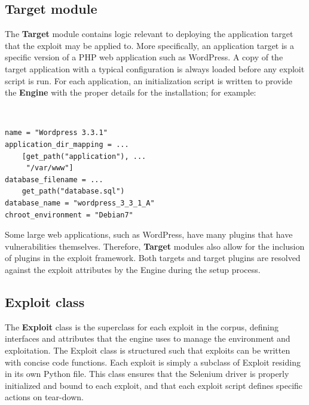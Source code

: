 \documentclass[letterpaper,twocolumn,10pt]{article}
\begin{document}


\subsection{Target module}
The {\bf Target} module contains logic relevant to deploying the application target that the exploit may be applied to.  More specifically, an application target is a specific version of a PHP web application such as WordPress. A copy of the target application with a typical configuration is always loaded before any exploit script is run.  For each application, an initialization script is written to provide the {\bf Engine} with the proper details for the installation; for example:

\begin{minipage}{\textwidth}
{\tt \footnotesize
\begin{lstlisting}
name = "Wordpress 3.3.1"
application_dir_mapping = ...
    [get_path("application"), ...
     "/var/www"]
database_filename = ...
    get_path("database.sql")
database_name = "wordpress_3_3_1_A"
chroot_environment = "Debian7"
\end{lstlisting}
} 
\end{minipage}


Some large web applications, such as WordPress, have many plugins that have vulnerabilities themselves. Therefore, {\bf Target} modules also allow for the inclusion of plugins in the exploit framework. Both targets and target plugins are resolved against the exploit attributes by the Engine during the setup process. 


\subsection{Exploit class}
The {\bf Exploit} class is the superclass for each exploit in the corpus, defining interfaces and attributes that the engine uses to manage the environment and exploitation. The Exploit class is structured such that exploits can be written with concise code functions. Each exploit is simply a subclass of Exploit residing in its own Python file. This class ensures that the Selenium driver is properly initialized and bound to each exploit, and that each exploit script defines specific actions on tear-down.
\end{document}
